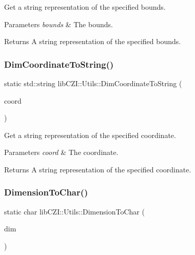Get a string representation of the specified bounds. 
\begin{DoxyParams}{Parameters}
{\em bounds} & The bounds. \\
\hline
\end{DoxyParams}
\begin{DoxyReturn}{Returns}
A string representation of the specified bounds. 
\end{DoxyReturn}
\mbox{\label{classlib_c_z_i_1_1_utils_aeb42843e65615302b51b68ad2b376e6d}} 
\subsubsection{\texorpdfstring{Dim\+Coordinate\+To\+String()}{DimCoordinateToString()}}
{\footnotesize\ttfamily static std\+::string lib\+C\+Z\+I\+::\+Utils\+::\+Dim\+Coordinate\+To\+String (\begin{DoxyParamCaption}\item[{const \hyperlink{classlib_c_z_i_1_1_i_dim_coordinate}{lib\+C\+Z\+I\+::\+I\+Dim\+Coordinate} $\ast$}]{coord }\end{DoxyParamCaption})\hspace{0.3cm}{\ttfamily [static]}}

Get a string representation of the specified coordinate. 
\begin{DoxyParams}{Parameters}
{\em coord} & The coordinate. \\
\hline
\end{DoxyParams}
\begin{DoxyReturn}{Returns}
A string representation of the specified coordinate. 
\end{DoxyReturn}
\mbox{\label{classlib_c_z_i_1_1_utils_ae97a98f63029f18282b1c940a79518a4}} 
\subsubsection{\texorpdfstring{Dimension\+To\+Char()}{DimensionToChar()}}
{\footnotesize\ttfamily static char lib\+C\+Z\+I\+::\+Utils\+::\+Dimension\+To\+Char (\begin{DoxyParamCaption}\item[{\hyperlink{namespacelib_c_z_i_a55049658acf59d0eddfaebcad16df424}{lib\+C\+Z\+I\+::\+Dimension\+Index}}]{dim }\end{DoxyParamCaption})\hspace{0.3cm}{\ttfamily [static]}}

